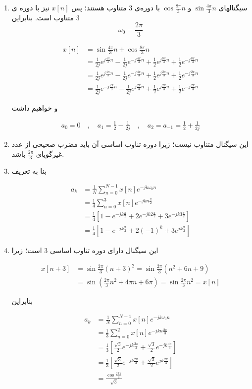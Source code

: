 \documentclass{article}
\newcommand{\qn}[1]{
\[
\begin{split}
#1
\end{split}
\]
}
\begin{document}
\begin{enumerate}[label=\alph*)]
\item
سیگنالهای 
$
\sin\frac{4\pi}{3}n
$
و
$
\cos\frac{8\pi}{3}n
$
با دوره‌ی 3 متناوب هستند؛ پس 
$
x[n]
$
نیز با دوره ی 3 متناوب است. بنابراین
$$
\omega_0=\frac{2\pi}{3}
$$

\qn{
x[n]&=\sin\frac{4\pi}{3}n+\cos\frac{8\pi}{3}n
\\&=
\frac{1}{2j}e^{j\frac{4\pi}{3}n}
-
\frac{1}{2j}e^{-j\frac{4\pi}{3}n}
+
\frac{1}{2}e^{j\frac{8\pi}{3}n}
+
\frac{1}{2}e^{-j\frac{8\pi}{3}n}
\\&=
\frac{1}{2j}e^{j\frac{4\pi}{3}n}
-
\frac{1}{2j}e^{-j\frac{4\pi}{3}n}
+
\frac{1}{2}e^{j\frac{2\pi}{3}n}
+
\frac{1}{2}e^{-j\frac{2\pi}{3}n}
\\&=
\frac{1}{2j}e^{-j\frac{2\pi}{3}n}
-
\frac{1}{2j}e^{j\frac{2\pi}{3}n}
+
\frac{1}{2}e^{j\frac{2\pi}{3}n}
+
\frac{1}{2}e^{-j\frac{2\pi}{3}n}
}
و خواهیم داشت
\qn{
a_0=0\quad,\quad a_1=\frac{1}{2}-\frac{1}{2j}\quad,\quad a_2=a_{-1}=\frac{1}{2}+\frac{1}{2j}
}

\item
این سیگنال متناوب نیست؛ زیرا دوره تناوب اساسی آن باید مضرب صحیحی از عدد غیرگویای 
$
\frac{2\pi}{3}
$
باشد.
\item
بنا به تعریف
\qn{
a_k&=\frac{1}{N}\sum_{n=0}^{N-1}x[n]e^{-jk\omega_0n}
\\&=\frac{1}{4}\sum_{n=0}^3x[n]e^{-jkn\frac{\pi}{2}}
\\&=\frac{1}{4}\left[
1-e^{-jk\frac{\pi}{2}}+2e^{-jk2\frac{\pi}{2}}+3e^{-jk3\frac{\pi}{2}}
\right]
\\&=\frac{1}{4}\left[
1-e^{-jk\frac{\pi}{2}}+2(-1)^k+3e^{jk\frac{\pi}{2}}
\right]
}

\item
این سیگنال دارای دوره تناوب اساسی 3 است؛ زیرا
\qn{
x[n+3]&=
\sin \frac{2\pi}{3}(n+3)^2
=
\sin \frac{2\pi}{3}(n^2+6n+9)
\\&=
\sin (\frac{2\pi}{3}n^2+4\pi n+6\pi)
=
\sin \frac{2\pi}{3}n^2=x[n]
}
بنابراین
\qn{
a_k&=\frac{1}{N}\sum_{n=0}^{N-1}x[n]e^{-jk\omega_0n}
\\&=\frac{1}{3}\sum_{n=0}^2x[n]e^{-jkn\frac{2\pi}{3}}
\\&=\frac{1}{3}\left[
\frac{\sqrt 3}{2}e^{-jk\frac{2\pi}{3}}+\frac{\sqrt 3}{2}e^{-jk\frac{4\pi}{3}}
\right]
\\&=\frac{1}{3}\left[
\frac{\sqrt 3}{2}e^{-jk\frac{2\pi}{3}}+\frac{\sqrt 3}{2}e^{jk\frac{2\pi}{3}}
\right]
\\&=\frac{\cos \frac{2k\pi}{3}}{\sqrt 3}
}
\end{enumerate}
\end{document}
